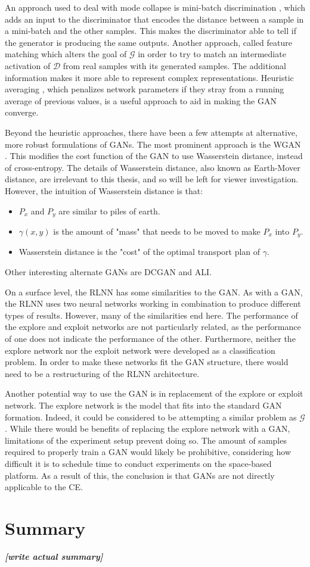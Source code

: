 	\par An approach used to deal with mode collapse is mini-batch discrimination \cite{placeholderCitation}, which adds an input to the discriminator that encodes the distance between a sample in a mini-batch and the other samples. This makes the discriminator able to tell if the generator is producing the same outputs. Another approach, called feature matching \cite{placeholderCitation} which alters the goal of $\mathcal{G}$ in order to try to match an intermediate activation of $\mathcal{D}$ from real samples with its generated samples. The additional information makes it more able to represent complex representations. Heuristic averaging \cite{placeholderCitation}, which penalizes network parameters if they stray from a running average of previous values, is a useful approach to aid in making the GAN converge. 
	\par Beyond the heuristic approaches, there have been a few attempts at alternative, more robust formulations of GANs. The most prominent approach is the WGAN \cite{bg:wganPaper}. This modifies the cost function of the GAN to use Wasserstein distance, instead of cross-entropy. The details of Wasserstein distance, also known as Earth-Mover distance, are irrelevant to this thesis, and so will be left for viewer investigation. However, the intuition of Wasserstein distance is that:  
	\begin{itemize}
		\item $P_x$ and $P_y$ are similar to piles of earth. 
		\item $\gamma(x,y)$ is the amount of "mass" that needs to be moved to make $P_x$ into $P_y$.
		\item Wasserstein distance is the "cost" of the optimal transport plan of $\gamma$.
	\end{itemize}
	Other interesting alternate GANs are DCGAN \cite{placeholderCitation} and ALI\cite{ALI_encdec_inference}.
	\par On a surface level, the RLNN has some similarities to the GAN. As with a GAN, the RLNN uses two neural networks working in combination to produce different types of results. However, many of the similarities end here. The performance of the explore and exploit networks are not particularly related, as the performance of one does not indicate the performance of the other. Furthermore, neither the explore network nor the exploit network were developed as a classification problem. In order to make these networks fit the GAN structure, there would need to be a restructuring of the RLNN architecture.
	\par Another potential way to use the GAN is in replacement of the explore or exploit network. The explore network is the model that fits into the standard GAN formation. Indeed, it could be considered to be attempting a similar problem as $\mathcal{G}$. While there would be benefits of replacing the explore network with a GAN, limitations of the experiment setup prevent doing so. The amount of samples required to properly train a GAN would likely be prohibitive, considering how difficult it is to schedule time to conduct experiments on the space-based platform. As a result of this, the conclusion is that GANs are not directly applicable to the CE.
	
	\section{Summary}
	\par \textbf{\textit{[write actual summary]}}
%